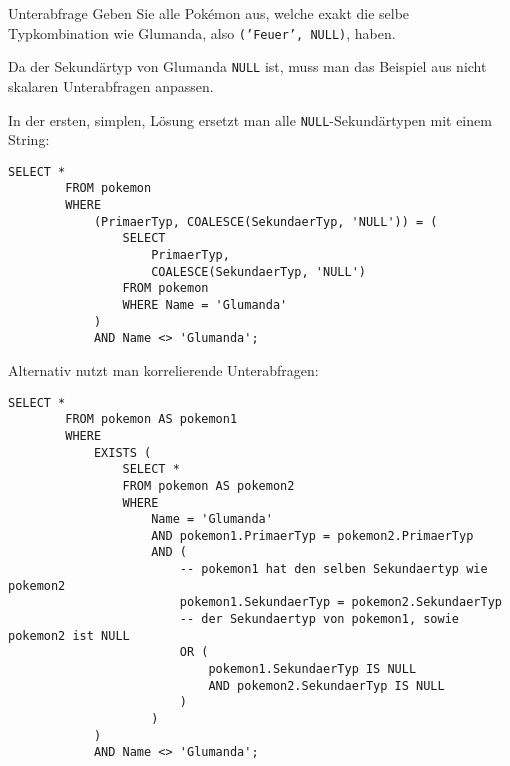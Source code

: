\begin{example}{Unterabfrage}
    Geben Sie alle Pokémon aus, welche exakt die selbe Typkombination wie Glumanda, also \texttt{('Feuer', NULL)}, haben.

    Da der Sekundärtyp von Glumanda \texttt{NULL} ist, muss man das Beispiel aus nicht skalaren Unterabfragen anpassen.

    \exampleseparator

    In der ersten, simplen, Lösung ersetzt man alle \texttt{NULL}-Sekundärtypen mit einem String:

    \begin{lstlisting}[language=mysql]
        SELECT *
        FROM pokemon
        WHERE
            (PrimaerTyp, COALESCE(SekundaerTyp, 'NULL')) = (
                SELECT
                    PrimaerTyp,
                    COALESCE(SekundaerTyp, 'NULL')
                FROM pokemon
                WHERE Name = 'Glumanda'
            )
            AND Name <> 'Glumanda';
    \end{lstlisting}

    Alternativ nutzt man korrelierende Unterabfragen:

    \begin{lstlisting}[language=mysql]
        SELECT *
        FROM pokemon AS pokemon1
        WHERE
            EXISTS (
                SELECT *
                FROM pokemon AS pokemon2
                WHERE
                    Name = 'Glumanda'
                    AND pokemon1.PrimaerTyp = pokemon2.PrimaerTyp
                    AND (
                        -- pokemon1 hat den selben Sekundaertyp wie pokemon2
                        pokemon1.SekundaerTyp = pokemon2.SekundaerTyp
                        -- der Sekundaertyp von pokemon1, sowie pokemon2 ist NULL 
                        OR (
                            pokemon1.SekundaerTyp IS NULL
                            AND pokemon2.SekundaerTyp IS NULL
                        )
                    )
            )
            AND Name <> 'Glumanda';
    \end{lstlisting}


\end{example}
